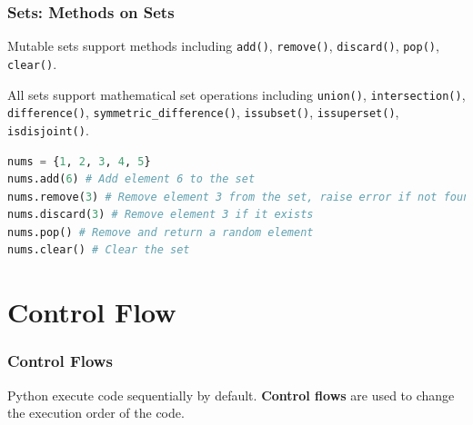 \documentclass[beamer, en, version=2.0]{huangfusl-template}
\begin{document}
    \begin{frame}[fragile]
        \frametitle{Sets: Methods on Sets}

        Mutable sets support methods including {\footnotesize\verb|add()|}, {\footnotesize\verb|remove()|}, {\footnotesize\verb|discard()|}, {\footnotesize\verb|pop()|}, {\footnotesize\verb|clear()|}.

        All sets support mathematical set operations including {\footnotesize\verb|union()|}, {\footnotesize\verb|intersection()|}, {\footnotesize\verb|difference()|}, {\footnotesize\verb|symmetric_difference()|}, {\footnotesize\verb|issubset()|}, {\footnotesize\verb|issuperset()|}, {\footnotesize\verb|isdisjoint()|}.

\begin{lstlisting}[language=python]
nums = {1, 2, 3, 4, 5}
nums.add(6) # Add element 6 to the set
nums.remove(3) # Remove element 3 from the set, raise error if not found
nums.discard(3) # Remove element 3 if it exists
nums.pop() # Remove and return a random element
nums.clear() # Clear the set
\end{lstlisting}
    \end{frame}
    \section{Control Flow}
    \begin{frame}[fragile]
        \frametitle{Control Flows}

        Python execute code sequentially by default. \textbf{Control flows} are used to change the execution order of the code.

    \end{frame}
\end{document}
